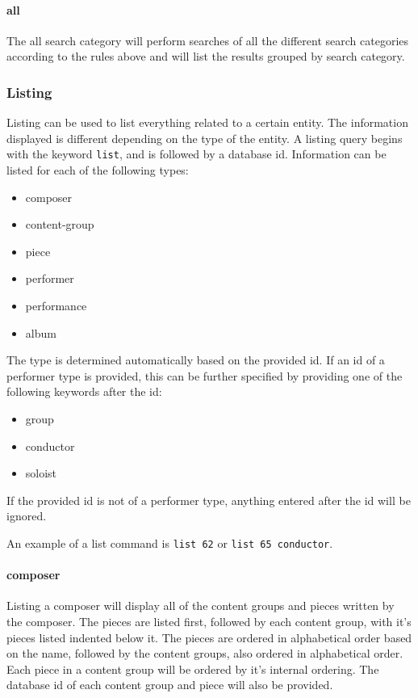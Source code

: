 \paragraph{all}
The all search category will perform searches of all the different search categories according to
the rules above and will list the results grouped by search category.

\subsubsection{Listing}
Listing can be used to list everything related to a certain entity.
The information displayed is different depending on the type of the entity.
A listing query begins with the keyword \texttt{list}, and is followed by a database id.
Information can be listed for each of the following types:
\begin{itemize}
    \item composer
    \item content-group
    \item piece
    \item performer
    \item performance
    \item album
\end{itemize}

The type is determined automatically based on the provided id.
If an id of a performer type is provided, this can be further specified by providing one of the
following keywords after the id:

\begin{itemize}
    \item group
    \item conductor
    \item soloist
\end{itemize}
If the provided id is not of a performer type, anything entered after the id will be ignored.

An example of a list command is \texttt{list 62} or \texttt{list 65 conductor}.

\paragraph{composer}
Listing a composer will display all of the content groups and pieces written by the composer.
The pieces are listed first, followed by each content group, with it's pieces listed indented below it.
The pieces are ordered in alphabetical order based on the name, followed by the content groups, also ordered in alphabetical order.
Each piece in a content group will be ordered by it's internal ordering.
The database id of each content group and piece will also be provided.

